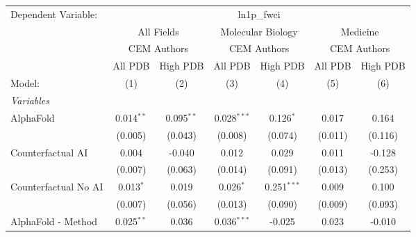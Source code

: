 \begingroup
\centering
\begin{tabular}{lcccccc}
   \tabularnewline \midrule \midrule
   Dependent Variable: & \multicolumn{6}{c}{ln1p\_fwci}\\
 & \multicolumn{2}{c}{All Fields} & \multicolumn{2}{c}{Molecular Biology} & \multicolumn{2}{c}{Medicine} \\
\cmidrule(lr){2-3} \cmidrule(lr){4-5} \cmidrule(lr){6-7}
 & \multicolumn{2}{c}{CEM Authors} & \multicolumn{2}{c}{CEM Authors} & \multicolumn{2}{c}{CEM Authors} \\
\cmidrule(lr){2-3} \cmidrule(lr){4-5} \cmidrule(lr){6-7}
 & \multicolumn{1}{c}{All PDB} & \multicolumn{1}{c}{High PDB} & \multicolumn{1}{c}{All PDB} & \multicolumn{1}{c}{High PDB} & \multicolumn{1}{c}{All PDB} & \multicolumn{1}{c}{High PDB} \\
\cmidrule(lr){2-2} \cmidrule(lr){3-3} \cmidrule(lr){4-4} \cmidrule(lr){5-5} \cmidrule(lr){6-6} \cmidrule(lr){7-7}
   Model:                                                     & (1)            & (2)           & (3)           & (4)           & (5)            & (6)\\  
   \midrule
   \emph{Variables}\\
   AlphaFold                                                  & 0.014$^{**}$   & 0.095$^{**}$  & 0.028$^{***}$ & 0.126$^{*}$   & 0.017          & 0.164\\   
                                                              & (0.005)        & (0.043)       & (0.008)       & (0.074)       & (0.011)        & (0.116)\\   
   Counterfactual AI                                          & 0.004          & -0.040        & 0.012         & 0.029         & 0.011          & -0.128\\   
                                                              & (0.007)        & (0.063)       & (0.014)       & (0.091)       & (0.013)        & (0.253)\\   
   Counterfactual No AI                                       & 0.013$^{*}$    & 0.019         & 0.026$^{*}$   & 0.251$^{***}$ & 0.009          & 0.100\\   
                                                              & (0.007)        & (0.056)       & (0.013)       & (0.090)       & (0.009)        & (0.093)\\   
   AlphaFold - Method                                         & 0.025$^{**}$   & 0.036         & 0.036$^{***}$ & -0.025        & 0.023          & -0.010\\   

\end{tabular}
